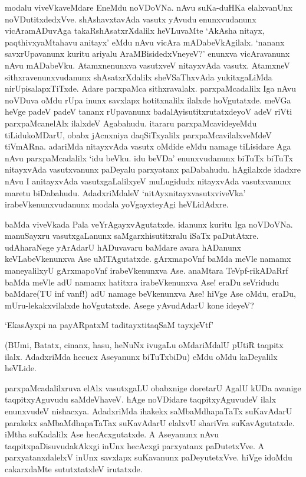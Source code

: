 modalu viveVkaveMdare EneMdu noVDoVNa. nAvu suKa-duHKa elalxvanUnx noVDutitxdedxVve. shAshavxtavAda vasutx yAvudu enunxvudanunx vicAramADuvAga takaRshAsatxrXdalilx heVLuvaMte `AkAsha nitayx, paqthivxyaMtahavu anitayx' eMdu nAvu vicAra mADabeVkAgilalx. `nananx savxrUpavanunx kuritu ariyalu AraMBisidedxVneyeV?' enunxva vicAravanunx nAvu mADabeVku. Atamxnenunxva vasutxveV nitayxvAda vasutx. AtamxneV sithxravenunxvudanunx shAsatxrXdalilx sheVSaThxvAda yukitxgaLiMda nirUpisalapxTiTxde. Adare parxpaMca sithxravalalx. parxpaMcadalilx Iga nAvu noVDuva oMdu rUpa inunx savxlapx hotitxnalilx ilalxde hoVgutatxde. meVGa heVge padeV padeV tananx rUpavanunx badalAyisutitxrutatxdeyoV adeV riVti parxpaMcanelAlx ilalxdeV Agabahudu. itararu parxpaMcavideyeMdu tiLidukoMDarU, obabx jAcnxniya daqSiTxyalilx parxpaMcavilalxveMdeV tiVmARna. adariMda nitayxvAda vasutx oMdide eMdu namage tiLisidare Aga nAvu parxpaMcadalilx `idu beVku. idu beVDa' enunxvudanunx biTuTx biTuTx nitayxvAda vasutxvanunx paDeyalu parxyatanx paDabahudu. hAgilalxde idadxre nAvu I anitayxvAda vasutxgaLalilxyeV muLugidudx nitayxvAda vasutxvanunx maretu biDabahudu. AdadxriMdaleV `nitAyxnitayxvasutxviveVka' irabeVkenunxvudanunx modala yoVgayxteyAgi heVLidAdxre.

baMda viveVkada Pala veYrAgayxvAgutatxde. idanunx kuritu Iga noVDoVNa. manuSayxru vasutxgaLanunx saMgarxhisutitxralu iSaTx paDutAtxre. udAharaNege yArAdarU hADuvavaru baMdare avara hADanunx keVLabeVkenunxva Ase uMTAgutatxde. gArxmapoVnf baMda meVle namamx maneyalilxyU gArxmapoVnf irabeVkenunxva Ase. anaMtara TeVpf-rikADaRrf baMda meVle adU namamx hatitxra irabeVkenunxva Ase! eraDu seVridudu baMdare(TU inf vanf!) adU namage beVkenunxva Ase! hiVge Ase oMdu, eraDu, mUru-lekakxvilalxde hoVgutatxde. Asege yAvudAdarU kone ideyeV?

\begin{shloka}
`EkasAyxpi na payARpatxM taditayxtitaqSaM tayxjeVtf'
\end{shloka}

(BUmi, Batatx, cinanx, hasu, heNuNx ivugaLu oMdariMdalU pUtiR taqpitx ilalx. AdadxriMda hecucx Aseyanunx biTuTxbiDu) eMdu oMdu kaDeyalilx heVLide.

parxpaMcadalilxruva elAlx vasutxgaLU obabxnige doretarU AgalU kUDa avanige taqpitxyAguvudu saMdeVhaveV. hAge noVDidare taqpitxyAguvudeV ilalx enunxvudeV nishacxya. AdadxriMda ihakekx saMbaMdhapaTaTx suKavAdarU parakekx saMbaMdhapaTaTax suKavAdarU elalxvU shariVra suKavAgutatxde. iMtha suKadalilx Ase hecAcxgutatxde. A Aseyanunx nAvu taqpitxpaDisuvudakAkxgi inUnx hecAcxgi parxyatanx paDutetxVve. A parxyatanxdalelxV inUnx savxlapx suKavanunx paDeyutetxVve. hiVge idoMdu cakarxdaMte sututxtatxleV irutatxde.

